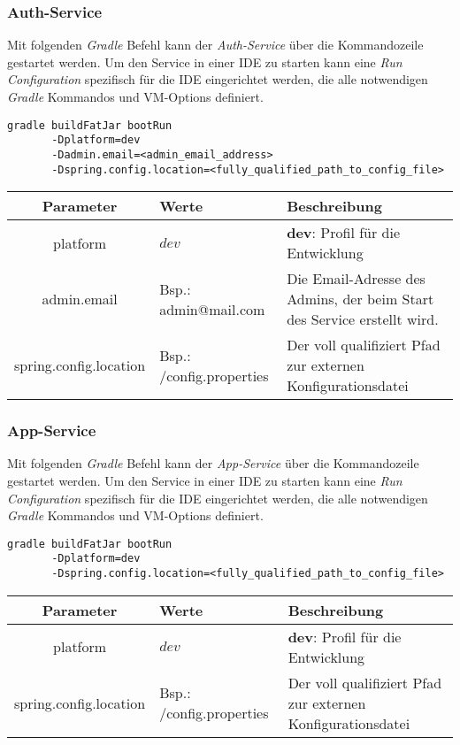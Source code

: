 \documentclass[]{article}
\begin{document}
{\subsubsection{Auth-Service}
Mit folgenden \emph{Gradle} Befehl kann der \emph{Auth-Service} über die Kommandozeile gestartet werden. Um den Service in einer IDE zu starten kann eine \emph{Run Configuration} spezifisch für die IDE eingerichtet werden, die alle notwendigen \emph{Gradle} Kommandos und VM-Options definiert.
\begin{verbatim}
gradle buildFatJar bootRun
       -Dplatform=dev
       -Dadmin.email=<admin_email_address>                
       -Dspring.config.location=<fully_qualified_path_to_config_file>
\end{verbatim}
{\renewcommand{\arraystretch}{2}%
\begin{center}
	\begin{tabular}{| c | l | p{7cm} |}
		\hline
		\textbf{Parameter} & \textbf{Werte} & \textbf{Beschreibung}  \\ \hline
		platform & $dev$ & \textbf{dev}: Profil für die Entwicklung \\ \hline
		admin.email & Bsp.: admin@mail.com & Die Email-Adresse des Admins, der beim Start des Service erstellt wird. \\ \hline
		spring.config.location & Bsp.: /config.properties & Der voll qualifiziert Pfad zur externen Konfigurationsdatei  \\ \hline
	\end{tabular}
\end{center}

\subsubsection{App-Service}
Mit folgenden \emph{Gradle} Befehl kann der \emph{App-Service} über die Kommandozeile gestartet werden. Um den Service in einer IDE zu starten kann eine \emph{Run Configuration} spezifisch für die IDE eingerichtet werden, die alle notwendigen \emph{Gradle} Kommandos und VM-Options definiert.
\begin{verbatim}
gradle buildFatJar bootRun
	   -Dplatform=dev              
	   -Dspring.config.location=<fully_qualified_path_to_config_file>
\end{verbatim}
{\renewcommand{\arraystretch}{2}%
\begin{center}
	\begin{tabular}{| c | l | p{7cm} |}
		\hline
		\textbf{Parameter} & \textbf{Werte} & \textbf{Beschreibung}  \\ \hline
		platform & $dev$ & \textbf{dev}: Profil für die Entwicklung \\ \hline
		spring.config.location & Bsp.: /config.properties & Der voll qualifiziert Pfad zur externen Konfigurationsdatei  \\ \hline
	\end{tabular}
\end{center}

}}}
\end{document}
